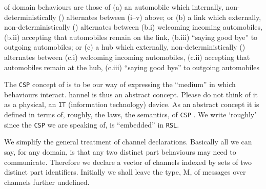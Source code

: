 \pind {} of domain behaviours are those of
\begynd
\pind (a) an automobile which 
\begynd
\pind internally, non-deterministically (\NONDETCHOICE)
\pind alternates between (i--v) above; or
\afslut
\pind (b) a link which 
\begynd
\pind externally, non-deterministically (\DETCHOICE) alternates between
\begynd
\pind (b.i) welcoming incoming automobiles,
\pind (b.ii) accepting that automobiles remain on the link,
\pind (b.iii) ``saying good bye'' to outgoing  automobiles; or
\afslut
\afslut
\pind (c) a hub which 
\begynd
\pind externally, non-deterministically (\DETCHOICE) alternates between
\begynd
\pind (c.i) welcoming incoming automobiles,
\pind (c.ii) accepting that automobiles remain at the hub,
\pind (c.iii) ``saying good bye'' to outgoing  automobiles \dbsquare
\afslut
\afslut
\afslut
\enew

\label{Channel Description}\label{Channel Analysis}

\begynd
\pind The \texttt{CSP} concept of  \nyl  is to be our way of
      expressing the ``medium'' \nyl  in which behaviours interact.
\begynd
\pind {}hannel is thus an abstract concept. 
\pind Please do not think of it as a physical, \nyl an \texttt{IT}
      (information technology) device.
\pind As an abstract concept it is defined in terms of, \nyl
      roughly, the laws, the semantics, of \texttt{CSP} \citecsp.
\pind We write `roughly' since the \texttt{CSP} \nyl
      we are speaking of, is ``embedded'' in \texttt{RSL}.
\afslut
\afslut
\mnewfoil


\mnewfoil
\noindent
\begynd
\pind We  simplify the general
      treatment of channel declarations.
\pind Basically all we can say, for any domain,
\begynd
\pind is that any two distinct part behaviours
\pind may need to communicate.
\afslut
\pind Therefore we declare a vector of channels \nyl
indexed by sets of two distinct part identifiers.
\noindent
\pind Initially we shall leave the type, \textsf{M},  of messages over channels
      further undefined.
\afslut

